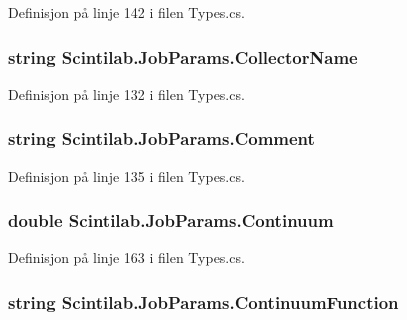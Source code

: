 Definisjon på linje 142 i filen Types.\+cs.

\hypertarget{class_scintilab_1_1_job_params_a50f5b190d5cb85fba96ab86ed2568084}{
\subsubsection[{Collector\+Name}]{\setlength{\rightskip}{0pt plus 5cm}string Scintilab.\+Job\+Params.\+Collector\+Name}}\label{class_scintilab_1_1_job_params_a50f5b190d5cb85fba96ab86ed2568084}


Definisjon på linje 132 i filen Types.\+cs.

\hypertarget{class_scintilab_1_1_job_params_adf347061e6e1ef2aded345c8704dd364}{
\subsubsection[{Comment}]{\setlength{\rightskip}{0pt plus 5cm}string Scintilab.\+Job\+Params.\+Comment}}\label{class_scintilab_1_1_job_params_adf347061e6e1ef2aded345c8704dd364}


Definisjon på linje 135 i filen Types.\+cs.

\hypertarget{class_scintilab_1_1_job_params_ab3354168d42a8f5c23e465efa4c9bde5}{
\subsubsection[{Continuum}]{\setlength{\rightskip}{0pt plus 5cm}double Scintilab.\+Job\+Params.\+Continuum}}\label{class_scintilab_1_1_job_params_ab3354168d42a8f5c23e465efa4c9bde5}


Definisjon på linje 163 i filen Types.\+cs.

\hypertarget{class_scintilab_1_1_job_params_a6560dfa91d1c2aee8308604a8d932ee3}{
\subsubsection[{Continuum\+Function}]{\setlength{\rightskip}{0pt plus 5cm}string Scintilab.\+Job\+Params.\+Continuum\+Function}}\label{class_scintilab_1_1_job_params_a6560dfa91d1c2aee8308604a8d932ee3}


